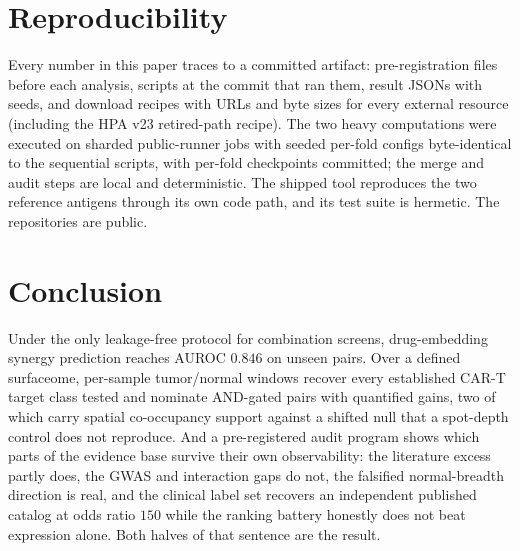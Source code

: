 \documentclass[11pt]{article}
\begin{document}
\section{Reproducibility}
Every number in this paper traces to a committed artifact: pre-registration
files before each analysis, scripts at the commit that ran them, result JSONs
with seeds, and download recipes with URLs and byte sizes for every external
resource (including the HPA v23 retired-path recipe). The two heavy
computations were executed on sharded public-runner jobs with seeded per-fold
configs byte-identical to the sequential scripts, with per-fold checkpoints
committed; the merge and audit steps are local and deterministic. The shipped
tool reproduces the two reference antigens through its own code path, and its
test suite is hermetic. The repositories are public.

\section{Conclusion}
Under the only leakage-free protocol for combination screens, drug-embedding
synergy prediction reaches AUROC $0.846$ on unseen pairs. Over a defined
surfaceome, per-sample tumor/normal windows recover every established CAR-T
target class tested and nominate AND-gated pairs with quantified gains,
two of which carry spatial co-occupancy support against a shifted null that a spot-depth control does not reproduce. And a
pre-registered audit program shows which parts of the evidence base survive
their own observability: the literature excess partly does, the GWAS and
interaction gaps do not, the falsified normal-breadth direction is real, and
the clinical label set recovers an independent published catalog at odds
ratio $150$ while the ranking battery honestly does not beat expression
alone. Both halves of that sentence are the result.
\end{document}
